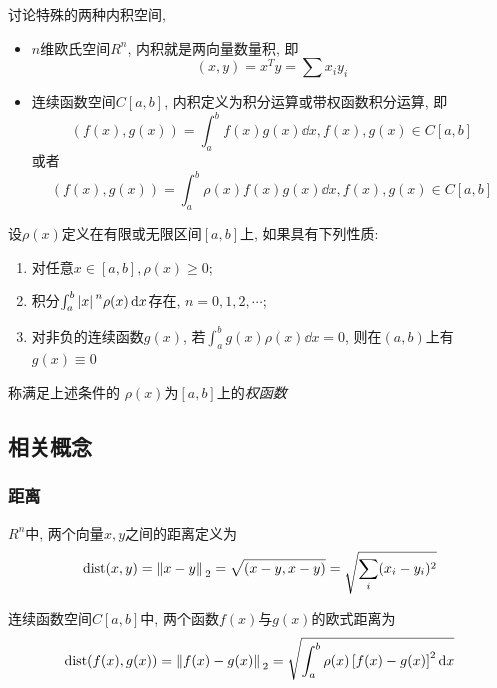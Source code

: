 讨论特殊的两种内积空间, 
\begin{itemize}
    \item $n$维欧氏空间$R^n$, 内积就是两向量数量积, 即
    \begin{equation*}
        (x,y)=x^Ty=\sum x_iy_i
    \end{equation*}
    \item 连续函数空间$C[a,b]$, 内积定义为积分运算或带权函数积分运算, 即
    \begin{equation*}
        (f(x),g(x))=\int_a^bf(x)g(x)\dd{x}, f(x),g(x)\in C[a,b]
    \end{equation*}
    或者
    \begin{equation*}
        (f(x),g(x))=\int_a^b\rho(x)f(x)g(x)\dd{x}, f(x),g(x)\in C[a,b]
    \end{equation*}
\end{itemize}

\begin{definition}[权函数]
    设$\rho(x)$定义在有限或无限区间$[a,b]$上, 如果具有下列性质:
    \begin{enumerate}
        \item 对任意$x\in [a,b], \rho(x)\ge 0$;
        \item 积分$\int_a^b\abs*{x}^n\rho(x)\dd{x}$存在, $n=0,1,2,\cdots$;
        \item 对非负的连续函数$g(x)$, 若$\int_a^bg(x)\rho(x)\dd{x}=0$, 则在$(a,b)$上有$g(x)\equiv0$
    \end{enumerate}
    称满足上述条件的 $\rho(x)$为$[a,b]$上的\emph{权函数}
\end{definition}

\subsection{相关概念}

\subsubsection{距离}

$R^n$中, 两个向量$x,y$之间的距离定义为
\begin{equation*}
    \text{dist}(x,y)=\norm*{x-y}_2=\sqrt{(x-y,x-y)}=\sqrt{\sum_i(x_i-y_i)^2}
\end{equation*}

连续函数空间$C[a,b]$中, 两个函数$f(x)$与$g(x)$的欧式距离为
\begin{equation*}
    \text{dist}(f(x),g(x))=\norm*{f(x)-g(x)}_2=\sqrt{\int_a^b\rho(x)\left[f(x)-g(x)\right]^2\dd{x}}
\end{equation*}

